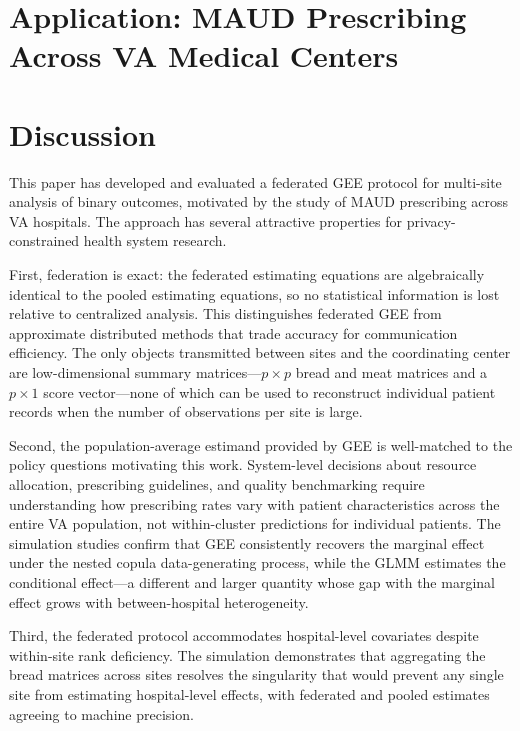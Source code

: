 \documentclass[useAMS,referee]{biom}
\begin{document}
\section{Application: MAUD Prescribing Across VA Medical Centers}
\label{s:application}


\section{Discussion}
\label{s:discuss}

This paper has developed and evaluated a federated GEE protocol for multi-site analysis of binary outcomes, motivated by the study of MAUD prescribing across VA hospitals. The approach has several attractive properties for privacy-constrained health system research.

First, federation is exact: the federated estimating equations are algebraically identical to the pooled estimating equations, so no statistical information is lost relative to centralized analysis. This distinguishes federated GEE from approximate distributed methods that trade accuracy for communication efficiency. The only objects transmitted between sites and the coordinating center are low-dimensional summary matrices---$p \times p$ bread and meat matrices and a $p \times 1$ score vector---none of which can be used to reconstruct individual patient records when the number of observations per site is large.

Second, the population-average estimand provided by GEE is well-matched to the policy questions motivating this work. System-level decisions about resource allocation, prescribing guidelines, and quality benchmarking require understanding how prescribing rates vary with patient characteristics across the entire VA population, not within-cluster predictions for individual patients. The simulation studies confirm that GEE consistently recovers the marginal effect under the nested copula data-generating process, while the GLMM estimates the conditional effect---a different and larger quantity whose gap with the marginal effect grows with between-hospital heterogeneity.

Third, the federated protocol accommodates hospital-level covariates despite within-site rank deficiency. The simulation demonstrates that aggregating the bread matrices across sites resolves the singularity that would prevent any single site from estimating hospital-level effects, with federated and pooled estimates agreeing to machine precision.
\end{document}
